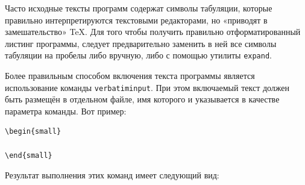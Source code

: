 Часто исходные тексты программ содержат символы табуляции, которые
правильно интерпретируются текстовыми редакторами, но «приводят в
замешательство» \TeX. Для того чтобы получить правильно отформатированный
листинг программы, следует предварительно заменить в ней все символы табуляции
на пробелы либо вручную, либо с помощью утилиты \verb|expand|.

Более правильным способом включения текста программы является использование
команды \verb|verbatiminput|. При этом
включаемый текст должен быть размещён в отдельном файле, имя которого и
указывается в качестве параметра команды. Вот пример:

\begin{small}
\begin{verbatim}
\begin{small}

\end{small}
\end{verbatim}
\end{small}

Результат выполнения этих команд имеет следующий вид:

\begin{small}

\end{small}


